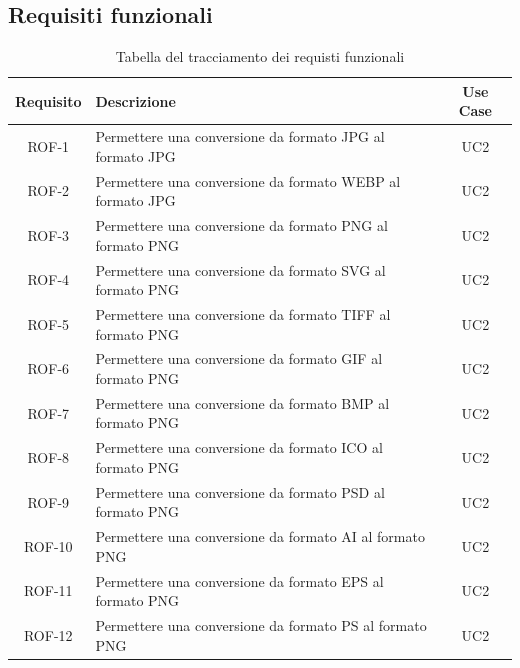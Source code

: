 \subsection{Requisiti funzionali}
\begin{table}[H]
    \caption{Tabella del tracciamento dei requisti funzionali}
    \label{tab:requisiti-funzionali}
    \begin{tabularx}{\textwidth}{|c|X|c|}
        \hline
        \textbf{Requisito} & \textbf{Descrizione}                                            & \textbf{Use Case} \\
        \hline
        ROF-1              & Permettere una conversione da formato JPG al
        formato JPG        & UC2
        \\
        \hline
        ROF-2              & Permettere una conversione da formato WEBP al formato JPG       & UC2
        \\
        \hline
        ROF-3              & Permettere una conversione da formato PNG al formato PNG        & UC2
        \\
        \hline
        ROF-4              & Permettere una conversione da formato SVG al formato PNG        & UC2
        \\
        \hline
        ROF-5              & Permettere una conversione da formato TIFF al formato PNG       & UC2
        \\
        \hline
        ROF-6              & Permettere una conversione da formato GIF al formato PNG        & UC2
        \\
        \hline
        ROF-7              & Permettere una conversione da formato BMP al formato PNG        & UC2
        \\
        \hline
        ROF-8              & Permettere una conversione da formato ICO al formato PNG        & UC2
        \\
        \hline
        ROF-9              & Permettere una conversione da formato PSD al formato PNG        & UC2
        \\
        \hline
        ROF-10             & Permettere una conversione da formato AI al formato PNG         & UC2
        \\
        \hline
        ROF-11             & Permettere una conversione da formato EPS al formato PNG        & UC2
        \\
        \hline
        ROF-12             & Permettere una conversione da formato PS al formato PNG         & UC2
        \\
        \hline

\end{tabularx}
\end{table}
